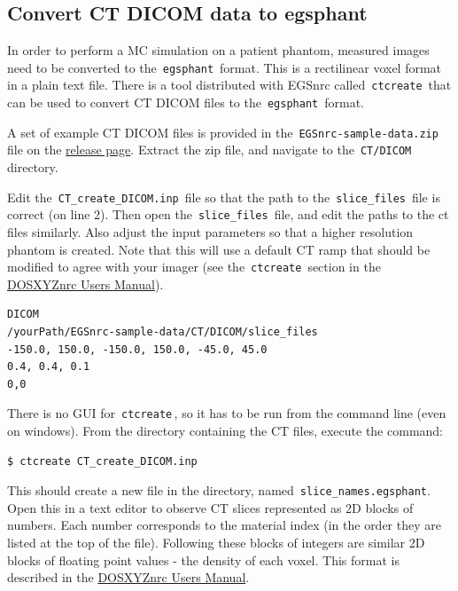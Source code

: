 \documentclass[12pt,twoside]{article}
\begin{document}
\clearpage
\subsection{Convert CT DICOM data to egsphant}
In order to perform a MC simulation on a patient phantom, measured images need to be converted to the \,\Verb|egsphant|\, format. This is a rectilinear voxel format in a plain text file. There is a tool distributed with EGSnrc called \,\Verb|ctcreate|\, that can be used to convert CT DICOM files to the \,\Verb|egsphant|\, format.

A set of example CT DICOM files is provided in the \,\Verb|EGSnrc-sample-data.zip|\, file on the \href{https://github.com/nrc-cnrc/EGSnrc/releases}{release page}. Extract the zip file, and navigate to the \,\Verb|CT/DICOM|\, directory.

Edit the \,\Verb|CT_create_DICOM.inp|\, file so that the path to the \,\Verb|slice_files|\, file is correct (on line 2). Then open the \,\Verb|slice_files|\, file, and edit the paths to the ct files similarly. Also adjust the input parameters so that a higher resolution phantom is created. Note that this will use a default CT ramp that should be modified to agree with your imager (see the \,\Verb|ctcreate|\, section in the \href{https://nrc-cnrc.github.io/EGSnrc/doc/pirs794-dosxyznrc.pdf}{DOSXYZnrc Users Manual}).

{\scriptsize
\begin{lstlisting}[language={},backgroundcolor=\color{white}]
DICOM
/yourPath/EGSnrc-sample-data/CT/DICOM/slice_files
-150.0, 150.0, -150.0, 150.0, -45.0, 45.0
0.4, 0.4, 0.1
0,0
\end{lstlisting}
}

There is no GUI for \,\Verb|ctcreate|\,, so it has to be run from the command line (even on windows). From the directory containing the CT files, execute the command:

\begin{lstlisting}
$ ctcreate CT_create_DICOM.inp
\end{lstlisting}

This should create a new file in the directory, named \,\Verb|slice_names.egsphant|. Open this in a text editor to observe CT slices represented as 2D blocks of numbers. Each number corresponds to the material index (in the order they are listed at the top of the file). Following these blocks of integers are similar 2D blocks of floating point values - the density of each voxel. This format is described in the \href{https://nrc-cnrc.github.io/EGSnrc/doc/pirs794-dosxyznrc.pdf}{DOSXYZnrc Users Manual}.
\end{document}
